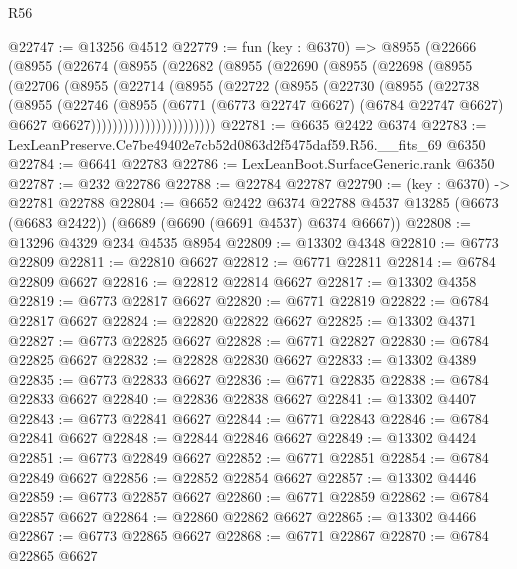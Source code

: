 \begin{lexlean}{R56}
\begin{coremodule}
@22747 := @13256 @4512
@22779 := fun (key : @6370) =>
  @8955
    (@22666
      (@8955
        (@22674
          (@8955
            (@22682
              (@8955
                (@22690
                  (@8955
                    (@22698
                      (@8955
                        (@22706
                          (@8955
                            (@22714
                              (@8955
                                (@22722
                                  (@8955
                                    (@22730
                                      (@8955
                                        (@22738
                                          (@8955
                                            (@22746
                                              (@8955
                                                (@6771
                                                  (@6773 @22747 @6627)
                                                  (@6784 @22747 @6627)
                                                  @6627
                                                  @6627)))))))))))))))))))))))
@22781 := @6635 @2422 @6374
@22783 := LexLeanPreserve.Ce7be49402e7cb52d0863d2f5475daf59.R56.__fits_69 @6350
@22784 := @6641 @22783
@22786 := LexLeanBoot.SurfaceGeneric.rank @6350
@22787 := @232 @22786
@22788 := @22784 @22787
@22790 := (key : @6370) -> @22781 @22788
@22804 := @6652
    @2422
    @6374
    @22788
    @4537
    @13285
    (@6673 (@6683 @2422))
    (@6689 (@6690 (@6691 @4537) @6374 @6667))
@22808 := @13296 @4329 @234 @4535 @8954
@22809 := @13302 @4348
@22810 := @6773 @22809
@22811 := @22810 @6627
@22812 := @6771 @22811
@22814 := @6784 @22809 @6627
@22816 := @22812 @22814 @6627
@22817 := @13302 @4358
@22819 := @6773 @22817 @6627
@22820 := @6771 @22819
@22822 := @6784 @22817 @6627
@22824 := @22820 @22822 @6627
@22825 := @13302 @4371
@22827 := @6773 @22825 @6627
@22828 := @6771 @22827
@22830 := @6784 @22825 @6627
@22832 := @22828 @22830 @6627
@22833 := @13302 @4389
@22835 := @6773 @22833 @6627
@22836 := @6771 @22835
@22838 := @6784 @22833 @6627
@22840 := @22836 @22838 @6627
@22841 := @13302 @4407
@22843 := @6773 @22841 @6627
@22844 := @6771 @22843
@22846 := @6784 @22841 @6627
@22848 := @22844 @22846 @6627
@22849 := @13302 @4424
@22851 := @6773 @22849 @6627
@22852 := @6771 @22851
@22854 := @6784 @22849 @6627
@22856 := @22852 @22854 @6627
@22857 := @13302 @4446
@22859 := @6773 @22857 @6627
@22860 := @6771 @22859
@22862 := @6784 @22857 @6627
@22864 := @22860 @22862 @6627
@22865 := @13302 @4466
@22867 := @6773 @22865 @6627
@22868 := @6771 @22867
@22870 := @6784 @22865 @6627

\end{coremodule}
\end{lexlean}
